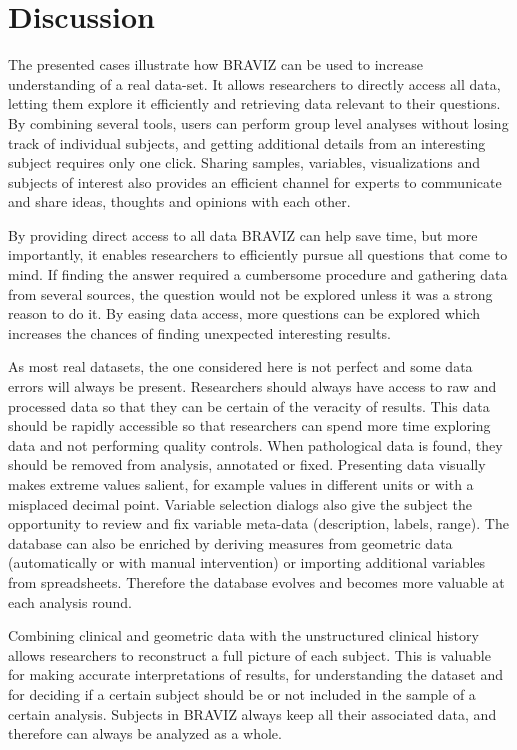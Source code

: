 \documentclass[twocolumn]{svjour3}
\begin{document}
\section{Discussion}
\label{sec:disc}

The presented cases illustrate how BRAVIZ can be used to increase understanding of a real data-set. 
It allows researchers to directly access all data, letting them explore it efficiently and retrieving data relevant to their questions. By combining several tools, users can perform group level analyses without losing track of individual subjects, and getting additional details from an interesting subject requires only one click. Sharing samples, variables, visualizations and subjects of interest also provides an efficient channel for experts to communicate and share ideas, thoughts and opinions with each other.

By providing direct access to all data BRAVIZ can help save time, but more importantly, it enables researchers to efficiently pursue all questions that come to mind. If finding the answer required a cumbersome procedure and gathering data from several sources, the question would not be explored unless it was a strong reason to do it. By easing data access, more questions can be explored which increases the chances of finding unexpected interesting results.

As most real datasets, the one considered here is not perfect and some data errors will always be present. Researchers should always have access to raw and processed data so that they can be certain of the veracity of results. This data should be rapidly accessible so that researchers can spend more time exploring data and not performing quality controls. When pathological data is found, they should be removed from analysis, annotated or fixed. Presenting data visually makes extreme values salient, for example values in different units or with a misplaced decimal point. Variable selection dialogs also give the subject the opportunity to review and fix variable meta-data (description, labels, range). The database can also be enriched by deriving measures from geometric data (automatically or with manual intervention) or importing additional variables from spreadsheets. Therefore the database evolves and becomes more valuable at each analysis round. 

Combining clinical and geometric data with the unstructured clinical history allows researchers to reconstruct a full picture of each subject. This is valuable for making accurate interpretations of results, for understanding the dataset and for deciding if a certain subject should be or not included in the sample of a certain analysis. Subjects in BRAVIZ always keep all their associated data, and therefore can always be analyzed as a whole.
\end{document}
